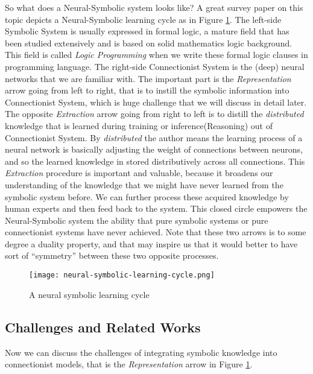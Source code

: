 \documentclass[letterpaper,10pt]{article}
\theoremstyle{definition}
\begin{document}
So what does a Neural-Symbolic system looks like? A great survey paper on this
topic\cite{bader2005dimensions} depicts a Neural-Symbolic learning cycle as in
Figure \ref{fig:ns_cycle}. The left-side Symbolic System is usually expressed
in formal logic, a mature field that has been studied extensively and is based
on solid mathematics logic background. This field is called \emph{Logic
Programming}\cite{lloyd2012foundations} when we write these formal logic clauses
in programming language. The right-side Connectionist System is the (deep) neural
networks that we are familiar with. The important part is the \emph{Representation}
arrow going from left to right, that is to instill the symbolic information into 
Connectionist System, which is huge challenge that we will discuss in detail later.
The opposite \emph{Extraction} arrow going from right to left is to distill the
\emph{distributed} knowledge that is learned during training or inference(Reasoning)
out of Connectionist System. By \emph{distributed} the author means the learning process of
a neural network is basically adjusting the weight of connections between neurons,
and so the learned knowledge in stored distributively across all connections.
This \emph{Extraction} procedure is important and valuable, because it broadens our
understanding of the knowledge that we might have never learned from the symbolic
system before. We can further process these acquired knowledge by human experts
and then feed back to the system. This closed circle empowers the Neural-Symbolic
system the ability that pure symbolic systems or pure connectionist systems have
never achieved. Note that these two arrows is to some degree a duality property,
and that may inspire us that it would better to have sort of “symmetry” between these two opposite processes. 

\begin{figure}[h]
\centering
\texttt{[image: neural-symbolic-learning-cycle.png]}
\caption{A neural symbolic learning cycle\protect\footnotemark}
\label{fig:ns_cycle}
\end{figure}


\subsection{Challenges and Related Works}

Now we can discuss the challenges of integrating symbolic knowledge into connectionist models, that is the \emph{Representation} arrow in Figure \ref{fig:ns_cycle}. 
\end{document}
